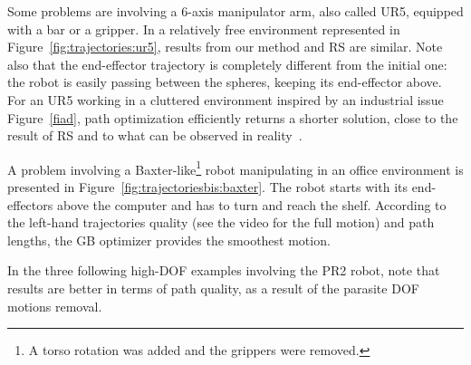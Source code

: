 \documentclass{tADR2e}
\begin{document}
Some problems are 
involving a 6-axis manipulator arm, also called UR5, equipped with a bar or a 
gripper.
In a relatively free environment represented in Figure~\ref{fig:trajectories:ur5}, 
results from our method and RS are similar. 
Note also that the end-effector trajectory is completely different from the initial 
one: the robot is easily passing between the spheres, keeping its end-effector 
above.
For an UR5 working in a cluttered environment inspired by an industrial issue 
Figure~\ref{fiad}, path optimization efficiently returns a shorter solution, close 
to the result of RS and to what can be observed in 
reality~\cite{factory-day-video}.

A problem involving a Baxter-like\footnote{A torso rotation was added and 
the grippers were removed.} robot 
manipulating in an office environment is presented in
Figure~\ref{fig:trajectoriesbis:baxter}. The robot starts with its end-effectors 
above the computer and has to 
turn and reach the shelf. According to the left-hand trajectories quality (see the 
video for the full motion) and path lengths, the GB optimizer provides 
the smoothest motion.

\vspace{0.4cm}

In the three following high-DOF examples involving the PR2 robot, note that 
results are better in terms of path quality, as a result of the parasite 
DOF motions removal.
\end{document}
